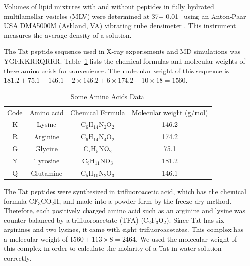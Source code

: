 Volumes of lipid mixtures with and without peptides in fully hydrated multilamellar
vesicles (MLV) were determined at 37$\pm$ 0.01 \textcelsius\ using 
an Anton-Paar USA DMA5000M (Ashland, VA) vibrating tube densimeter 
\cite{ref:}. This instrument measures the average density of a solution. 

The Tat peptide sequence used in X-ray experiements and MD simulations was 
YGRKKRRQRRR. 
Table~\ref{tb:aa} lists the chemical formulas and molecular weights of
these amino acids for convenience. The molecular 
weight of this sequence is 
$181.2+75.1+146.1+2 \times 146.2+6\times 174.2-10\times 18=1560$.
\begin{table}[ht]
  \centering
  \begin{tabular}{c c c c}
    Code & Amino acid & Chemical Formula & Molecular weight (g/mol) \\
    K & Lysine & $\mathrm{C_6H_{14}N_2O_2}$ & 146.2 \\
    R & Arginine & $\mathrm{C_6H_{14}N_4O_2}$ & 174.2 \\
    G & Glycine & $\mathrm{C_2H_5NO_2}$ & 75.1\\
    Y & Tyrosine & $\mathrm{C_9H_{11}NO_3}$ & 181.2 \\
    Q & Glutamine & $\mathrm{C_5H_{10}N_2O_3}$ & 146.1  
  \end{tabular}
  \caption{Some Amino Acids Data}
  \label{tb:aa}
\end{table}
The Tat peptides were synthesized in trifluoroacetic acid, which has 
the chemical formula $\mathrm{CF_3CO_2H}$, and made into a powder form by the 
freeze-dry method. Therefore, each positively charged amino acid such as 
an arginine and lysine was counter-balanced by a trifluoroacetate (TFA)
($\mathrm{C_2F_3O_2}$). Since Tat has six arginines and two lysines, it came 
with eight trifluoroacetates. This complex has a molecular weight of 
$1560+113\times 8=2464$. We used the 
molecular weight of this complex in order to calculate the molarity of a Tat
in water solution correctly.

